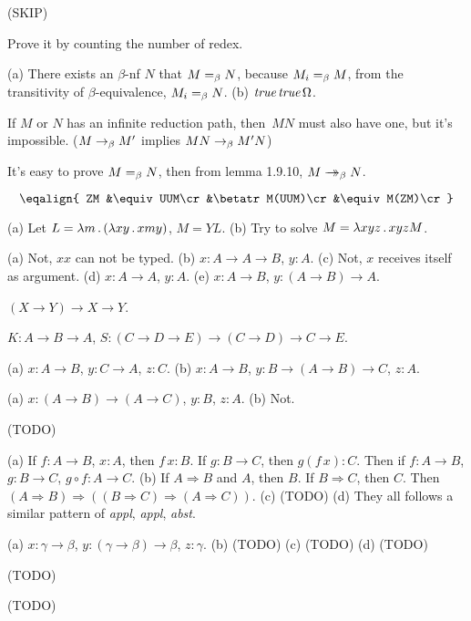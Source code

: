 (SKIP)

 Prove it by counting the number of redex.

 (a) There exists an $\beta$-nf $N$ that $M=_\beta N$, because $M_i=_\beta M$, from
the transitivity of $\beta$-equivalence, $M_i=_\beta N$. \nextquestion
(b) $\hbox{\it true}\,\hbox{\it true}\,\Omega$.

 If $M$ or $N$ has an infinite reduction path, then~$MN$ must also have one, but it's impossible.
($M\to_\beta M'$ implies $MN\to_\beta M'N$)

 It's easy to prove $M=_\beta N$, then from lemma 1.9.10, $M\to\!\!\!\!\!\to_\beta N$.

 $$
\eqalign{
ZM
&\equiv UUM\cr
&\betatr M(UUM)\cr
&\equiv M(ZM)\cr
}$$

 (a) Let $L = \lambda m\,.\, (\lambda xy\,.\, xmy)$, $M = YL$.\nextquestion
(b) Try to solve $M = \lambda xyz \,.\, xyzM$.

 (a) Not, $xx$ can not be typed.\nextquestion
(b) $x: A\to A\to B$, $y: A$.\nextquestion
(c) Not, $x$ receives itself as argument.\nextquestion
(d) $x: A\to A$, $y: A$.\nextquestion
(e) $x: A\to B$, $y: (A\to B)\to A$.

 $(X\to Y)\to X\to Y$.

 $K: A\to B\to A$, $S: (C\to D\to E)\to(C\to D)\to C\to E$.

 (a) $x: A\to B$, $y: C\to A$, $z: C$.\nextquestion
(b) $x: A\to B$, $y: B\to(A\to B)\to C$, $z: A$.

 (a) $x: (A\to B)\to (A\to C)$, $y: B$, $z: A$.\nextquestion
(b) Not.

 (TODO)

 (a) If $f: A\to B$, $x: A$, then $f\,x: B$. If $g: B\to C$, then $g(f\,x):C$.
Then if $f: A\to B$, $g: B\to C$, $g\circ f: A\to C$.\nextquestion
(b) If $A\Rightarrow B$ and $A$, then $B$. If $B\Rightarrow C$, then $C$. Then
$(A\Rightarrow B)\Rightarrow ((B\Rightarrow C)\Rightarrow (A\Rightarrow C))$.\nextquestion
(c) (TODO) \nextquestion
(d) They all follows a similar pattern of {\it appl}, {\it appl}, {\it abst}.

 (a) $x: \gamma \to \beta$, $y: (\gamma\to\beta)\to\beta$, $z: \gamma$.\nextquestion
(b) (TODO) \nextquestion
(c) (TODO) \nextquestion
(d) (TODO) \nextquestion

 (TODO)

 (TODO)

